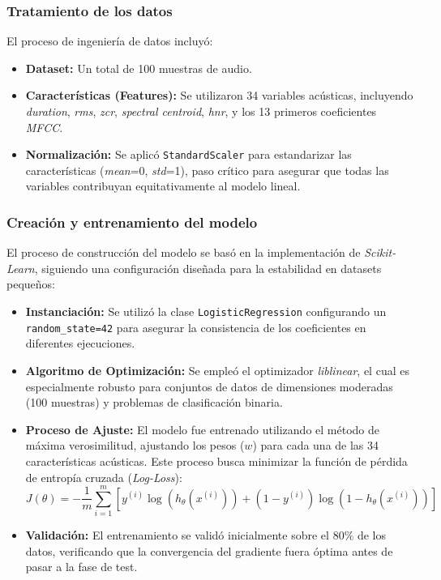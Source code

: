 \subsubsection*{Tratamiento de los datos}

El proceso de ingeniería de datos incluyó:
\begin{itemize}
    \item \textbf{Dataset:} Un total de 100 muestras de audio.
    \item \textbf{Características (Features):} Se utilizaron 34 variables acústicas, incluyendo \textit{duration}, \textit{rms}, \textit{zcr}, \textit{spectral centroid}, \textit{hnr}, y los 13 primeros coeficientes \textit{MFCC}.
    \item \textbf{Normalización:} Se aplicó \texttt{StandardScaler} para estandarizar las características (\textit{mean}=0, \textit{std}=1), paso crítico para asegurar que todas las variables contribuyan equitativamente al modelo lineal.
\end{itemize}

\subsubsection*{Creación y entrenamiento del modelo}

El proceso de construcción del modelo se basó en la implementación de \textit{Scikit-Learn}, siguiendo una configuración diseñada para la estabilidad en datasets pequeños:

\begin{itemize}
    \item \textbf{Instanciación:} Se utilizó la clase \texttt{LogisticRegression} configurando un \texttt{random\_state=42} para asegurar la consistencia de los coeficientes en diferentes ejecuciones.
    \item \textbf{Algoritmo de Optimización:} Se empleó el optimizador \textit{liblinear}, el cual es especialmente robusto para conjuntos de datos de dimensiones moderadas (100 muestras) y problemas de clasificación binaria.
    \item \textbf{Proceso de Ajuste:} El modelo fue entrenado utilizando el método de máxima verosimilitud, ajustando los pesos ($w$) para cada una de las 34 características acústicas. Este proceso busca minimizar la función de pérdida de entropía cruzada (\textit{Log-Loss}):
    \begin{equation}
        J(\theta) = -\frac{1}{m} \sum_{i=1}^{m} [y^{(i)} \log(h_\theta(x^{(i)})) + (1 - y^{(i)}) \log(1 - h_\theta(x^{(i)}))]
    \end{equation}
    \item \textbf{Validación:} El entrenamiento se validó inicialmente sobre el 80\% de los datos, verificando que la convergencia del gradiente fuera óptima antes de pasar a la fase de test.
\end{itemize}